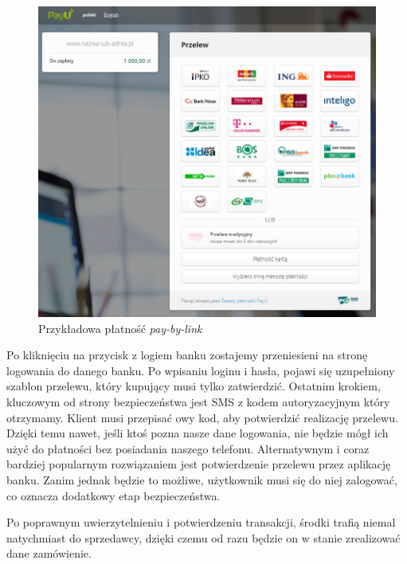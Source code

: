 \documentclass[12pt]{article}
\numberwithin{figure}{section}
\begin{document}
\begin{sloppypar}
\begin{figure}[!htbp] 
 	\centering
	\includegraphics[width=1\textwidth]{images/chapter_2/pay-by-link.png}
	\caption{Przykładowa płatność \textit{pay-by-link}}
	\label{fig:pay-by-link}
\end{figure}

Po kliknięciu na przycisk z logiem banku zostajemy przeniesieni na stronę logowania do danego banku. Po wpisaniu loginu i hasła, pojawi się uzupełniony szablon przelewu, który kupujący musi tylko zatwierdzić. Ostatnim krokiem, kluczowym od strony bezpieczeństwa jest SMS z kodem autoryzacyjnym który otrzymamy. Klient musi przepisać owy kod, aby potwierdzić realizację przelewu. Dzięki temu nawet, jeśli ktoś pozna nasze dane logowania, nie będzie mógł ich użyć do płatności bez posiadania naszego telefonu. Alternatywnym i coraz bardziej popularnym rozwiązaniem jest potwierdzenie przelewu przez aplikację banku. Zanim jednak będzie to możliwe, użytkownik musi się do niej zalogować, co oznacza dodatkowy etap bezpieczeństwa.

Po poprawnym uwierzytelnieniu i potwierdzeniu transakcji, środki trafią niemal natychmiast do sprzedawcy, dzięki czemu od razu będzie on w stanie zrealizować dane zamówienie.


\end{sloppypar}
\end{document}
